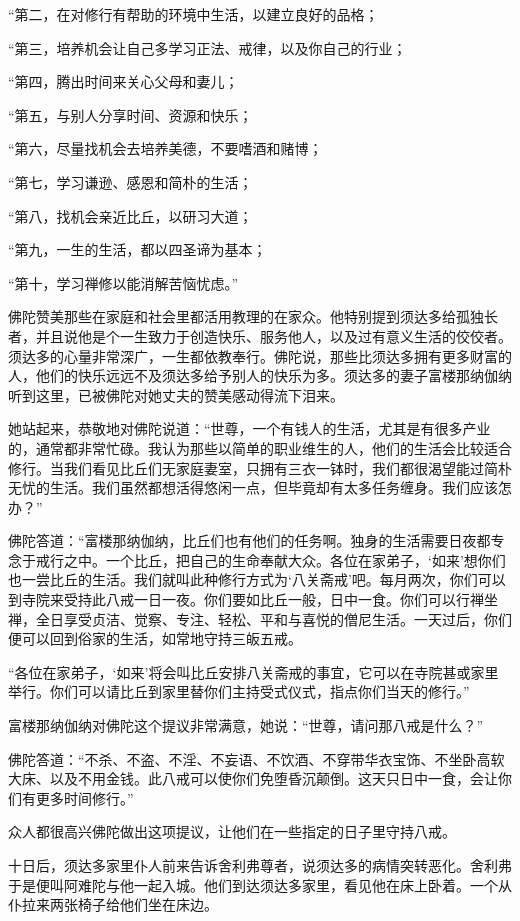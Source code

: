 \documentclass[12pt,twoside,openany]{book}
\begin{document}
“第二，在对修行有帮助的环境中生活，以建立良好的品格；

“第三，培养机会让自己多学习正法、戒律，以及你自己的行业；

“第四，腾出时间来关心父母和妻儿；

“第五，与别人分享时间、资源和快乐；

“第六，尽量找机会去培养美德，不要嗜酒和赌博；

“第七，学习谦逊、感恩和简朴的生活；

“第八，找机会亲近比丘，以研习大道；

“第九，一生的生活，都以四圣谛为基本；

“第十，学习禅修以能消解苦恼忧虑。”

佛陀赞美那些在家庭和社会里都活用教理的在家众。他特别提到须达多给孤独长者，并且说他是个一生致力于创造快乐、服务他人，以及过有意义生活的佼佼者。须达多的心量非常深广，一生都依教奉行。佛陀说，那些比须达多拥有更多财富的人，他们的快乐远远不及须达多给予别人的快乐为多。须达多的妻子富楼那纳伽纳听到这里，已被佛陀对她丈夫的赞美感动得流下泪来。

她站起来，恭敬地对佛陀说道：“世尊，一个有钱人的生活，尤其是有很多产业的，通常都非常忙碌。我认为那些以简单的职业维生的人，他们的生活会比较适合修行。当我们看见比丘们无家庭妻室，只拥有三衣一钵时，我们都很渴望能过简朴无忧的生活。我们虽然都想活得悠闲一点，但毕竟却有太多任务缠身。我们应该怎办？”

佛陀答道：“富楼那纳伽纳，比丘们也有他们的任务啊。独身的生活需要日夜都专念于戒行之中。一个比丘，把自己的生命奉献大众。各位在家弟子，‘如来’想你们也一尝比丘的生活。我们就叫此种修行方式为‘八关斋戒’吧。每月两次，你们可以到寺院来受持此八戒一日一夜。你们要如比丘一般，日中一食。你们可以行禅坐禅，全日享受贞洁、觉察、专注、轻松、平和与喜悦的僧尼生活。一天过后，你们便可以回到俗家的生活，如常地守持三皈五戒。

“各位在家弟子，‘如来’将会叫比丘安排八关斋戒的事宜，它可以在寺院甚或家里举行。你们可以请比丘到家里替你们主持受式仪式，指点你们当天的修行。”

富楼那纳伽纳对佛陀这个提议非常满意，她说：“世尊，请问那八戒是什么？”

佛陀答道：“不杀、不盗、不淫、不妄语、不饮酒、不穿带华衣宝饰、不坐卧高软大床、以及不用金钱。此八戒可以使你们免堕昏沉颠倒。这天只日中一食，会让你们有更多时间修行。”

众人都很高兴佛陀做出这项提议，让他们在一些指定的日子里守持八戒。

十日后，须达多家里仆人前来告诉舍利弗尊者，说须达多的病情突转恶化。舍利弗于是便叫阿难陀与他一起入城。他们到达须达多家里，看见他在床上卧着。一个从仆拉来两张椅子给他们坐在床边。
\end{document}
